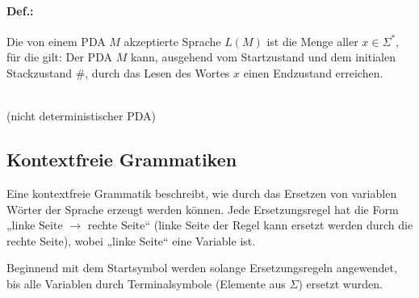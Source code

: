 \documentclass{scrreprt}
\begin{document}
\paragraph{Def.:} Die von einem PDA $M$ akzeptierte Sprache $L(M)$ ist die Menge aller $x \in \Sigma^*$, für die gilt: Der PDA $M$ kann, ausgehend vom Startzustand und dem initialen Stackzustand $\#$, durch das Lesen des Wortes $x$ einen Endzustand erreichen.\bigskip\\
\\
(nicht deterministischer PDA)

\subsection{Kontextfreie Grammatiken}
Eine kontextfreie Grammatik beschreibt, wie durch das Ersetzen von variablen Wörter der Sprache erzeugt werden können. Jede Ersetzungsregel hat die Form „linke Seite $\to$ rechte Seite“ (linke Seite der Regel kann ersetzt werden durch die rechte Seite), wobei „linke Seite“ eine Variable ist. 

Beginnend mit dem Startsymbol werden solange Ersetzungsregeln angewendet, bis alle Variablen durch Terminalsymbole (Elemente aus $\Sigma$) ersetzt wurden.
\end{document}
